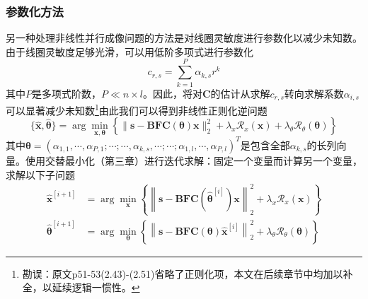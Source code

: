 \documentclass[12pt]{article}
\begin{document}
\subsubsection{参数化方法}\label{chap:2.6.1.2}
另一种处理非线性并行成像问题的方法是对线圈灵敏度进行参数化以减少未知数。由于线圈灵敏度足够光滑，可以用低阶多项式进行参数化
\begin{equation}
    c_{r,s}=\sum_{k=1}^{P} \alpha_{k,s}r^k
    \label{equ:2.43.0}
\end{equation}
其中$P$是多项式阶数，$P\ll n\times l$。因此，将对$\mathbf{C}$的估计从求解$c_{r,s}$转向求解系数$\alpha_{i,s}$可以显著减少未知数\footnote{勘误：原文p51-53(2.43)-(2.51)省略了正则化项，本文在后续章节中均加以补全，以延续逻辑一惯性。}由此我们可以得到非线性正则化逆问题
\begin{equation}
    \{\hat{\bm{x}},\hat{\bm{\theta}}\}=\arg\min_{\bm{x},\bm{\theta}}\left\{\|\bm{s}-\mathbf{B}\mathbf{F}\mathbf{C}(\bm{\theta})\bm{x}\|_2^2+\lambda_x\mathcal{R}_x(\bm{x})+\lambda_\theta\mathcal{R}_\theta(\bm{\theta})\right\}
    \label{equ:2.43}
\end{equation}
其中$\bm{\theta}=(\alpha_{1,1},\cdots,\alpha_{P,1};\cdots;\cdots,\alpha_{k,s},\cdots;\cdots;\alpha_{1,l},\cdots,\alpha_{P,l})^T$是包含全部$\alpha_{k,s}$的长列向量。使用交替最小化（第三章）进行迭代求解：固定一个变量而计算另一个变量，求解以下子问题
\begin{align}
    \hat{\bm{x}}^{[i+1]}&=\arg\min_{\bm{x}}\left\{\left\|\bm{s}-\mathbf{B}\mathbf{F}\mathbf{C}\left(\hat{\bm{\theta}}^{[i]}\right)\bm{x}\right\|_2^2+\lambda_x\mathcal{R}_x(\bm{x})\right\}
    \label{equ:2.44a} \\
    \hat{\bm{\theta}}^{[i+1]}&=\arg\min_{\bm{\theta}}\left\{\left\|\bm{s}-\mathbf{B}\mathbf{F}\mathbf{C}(\bm{\theta})\hat{\bm{x}}^{[i]}\right\|_2^2+\lambda_\theta\mathcal{R}_\theta(\bm{\theta})\right\}
    \label{equ:2.44b}
\end{align}
\end{document}
